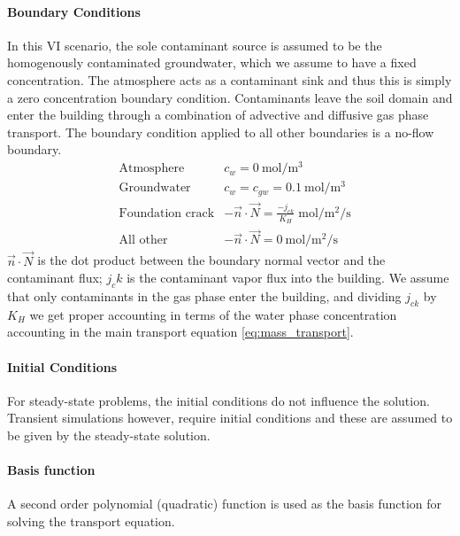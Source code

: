 
\paragraph{Boundary Conditions}

In this VI scenario, the sole contaminant source is assumed to be the homogenously contaminated groundwater, which we assume to have a fixed concentration.
The atmosphere acts as a contaminant sink and thus this is simply a zero concentration boundary condition.
Contaminants leave the soil domain and enter the building through a combination of advective and diffusive gas phase transport.
The boundary condition applied to all other boundaries is a no-flow boundary.
\begin{align}
  &\text{Atmosphere} & c_w = \SI{0}{\mol\per\metre\cubed} \\
  &\text{Groundwater} & c_w = c_{gw} = \SI{0.1}{\mol\per\metre\cubed} \\
  &\text{Foundation crack} & -\vec{n} \cdot \vec{N} = \frac{-j_{ck}}{K_H} \; \si{\mol\per\metre\squared\per\second}\\
  &\text{All other} & -\vec{n} \cdot \vec{N} = \SI{0}{\mol\per\metre\squared\per\second}
\end{align}
$\vec{n} \cdot \vec{N}$ is the dot product between the boundary normal vector and the contaminant flux;
$j_ck$ is the contaminant vapor flux into the building.
We assume that only contaminants in the gas phase enter the building, and dividing $j_{ck}$ by $K_H$ we get proper accounting in terms of the water phase concentration accounting in the main transport equation \ref{eq:mass_transport}.\par

\paragraph{Initial Conditions}

For steady-state problems, the initial conditions do not influence the solution.
Transient simulations however, require initial conditions and these are assumed to be given by the steady-state solution.\par

\paragraph{Basis function}

A second order polynomial (quadratic) function is used as the basis function for solving the transport equation.\par
